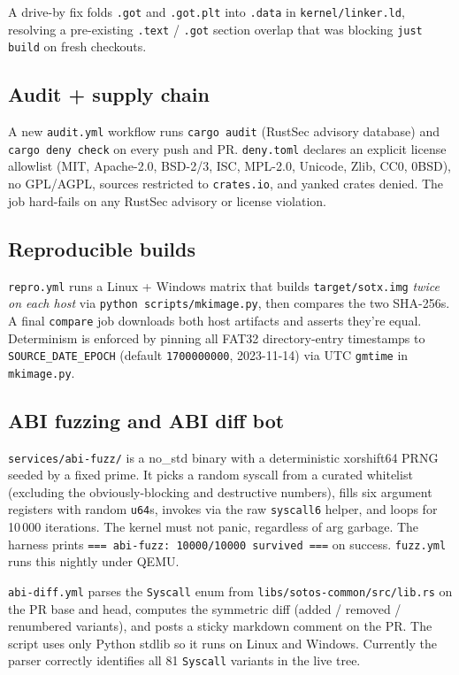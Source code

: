 \documentclass[11pt,a4paper]{article}
\begin{document}
A drive-by fix folds \texttt{.got} and \texttt{.got.plt} into
\texttt{.data} in \texttt{kernel/linker.ld}, resolving a pre-existing
\texttt{.text} / \texttt{.got} section overlap that was blocking
\texttt{just build} on fresh checkouts.

\subsection{Audit + supply chain}

A new \texttt{audit.yml} workflow runs \texttt{cargo audit} (RustSec
advisory database) and \texttt{cargo deny check} on every push and PR.
\texttt{deny.toml} declares an explicit license allowlist
(MIT, Apache-2.0, BSD-2/3, ISC, MPL-2.0, Unicode, Zlib, CC0, 0BSD), no
GPL/AGPL, sources restricted to \texttt{crates.io}, and yanked crates
denied. The job hard-fails on any RustSec advisory or license
violation.

\subsection{Reproducible builds}

\texttt{repro.yml} runs a Linux + Windows matrix that builds
\texttt{target/sotx.img} \emph{twice on each host} via
\texttt{python scripts/mkimage.py}, then compares the two SHA-256s.
A final \texttt{compare} job downloads both host artifacts and
asserts they're equal. Determinism is enforced by pinning all FAT32
directory-entry timestamps to \texttt{SOURCE\_DATE\_EPOCH} (default
\texttt{1700000000}, 2023-11-14) via UTC \texttt{gmtime} in
\texttt{mkimage.py}.

\subsection{ABI fuzzing and ABI diff bot}

\texttt{services/abi-fuzz/} is a no\_std binary with a deterministic
xorshift64 PRNG seeded by a fixed prime. It picks a random syscall
from a curated whitelist (excluding the obviously-blocking and
destructive numbers), fills six argument registers with random
\texttt{u64}s, invokes via the raw \texttt{syscall6} helper, and loops
for 10\,000 iterations. The kernel must not panic, regardless of arg
garbage. The harness prints \verb|=== abi-fuzz: 10000/10000 survived ===|
on success. \texttt{fuzz.yml} runs this nightly under QEMU.

\texttt{abi-diff.yml} parses the \texttt{Syscall} enum from
\texttt{libs/sotos-common/src/lib.rs} on the PR base and head, computes
the symmetric diff (added / removed / renumbered variants), and posts
a sticky markdown comment on the PR. The script uses only Python
stdlib so it runs on Linux and Windows. Currently the parser correctly
identifies all 81 \texttt{Syscall} variants in the live tree.
\end{document}
